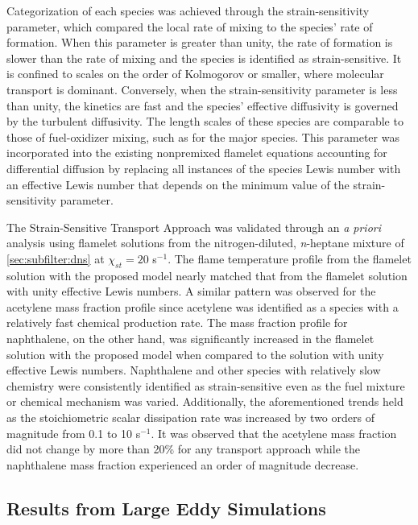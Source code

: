 Categorization of each species was achieved through the strain-sensitivity parameter, which compared the local rate of mixing to the species' rate of formation. When this parameter is greater than unity, the rate of formation is slower than the rate of mixing and the species is identified as strain-sensitive. It is confined to scales on the order of Kolmogorov or smaller, where molecular transport is dominant. Conversely, when the strain-sensitivity parameter is less than unity, the kinetics are fast and the species' effective diffusivity is governed by the turbulent diffusivity. The length scales of these species are comparable to those of fuel-oxidizer mixing, such as for the major species. This parameter was incorporated into the existing nonpremixed flamelet equations accounting for differential diffusion by replacing all instances of the species Lewis number with an effective Lewis number that depends on the minimum value of the strain-sensitivity parameter.

The Strain-Sensitive Transport Approach was validated through an \textit{a priori} analysis using flamelet solutions from the nitrogen-diluted, \textit{n}-heptane mixture of \cref{sec:subfilter:dns} at $\chi_{st} = 20$ s$^{-1}$. The flame temperature profile from the flamelet solution with the proposed model nearly matched that from the flamelet solution with unity effective Lewis numbers. A similar pattern was observed for the acetylene mass fraction profile since acetylene was identified as a species with a relatively fast chemical production rate. The mass fraction profile for naphthalene, on the other hand, was significantly increased in the flamelet solution with the proposed model when compared to the solution with unity effective Lewis numbers. Naphthalene and other species with relatively slow chemistry were consistently identified as strain-sensitive even as the fuel mixture or chemical mechanism was varied. Additionally, the aforementioned trends held as the stoichiometric scalar dissipation rate was increased by two orders of magnitude from 0.1 to 10 s$^{-1}$. It was observed that the acetylene mass fraction did not change by more than 20\% for any transport approach while the naphthalene mass fraction experienced an order of magnitude decrease.

\subsection{Results from Large Eddy Simulations}
\label{sec:conclusion:contributions:les}

